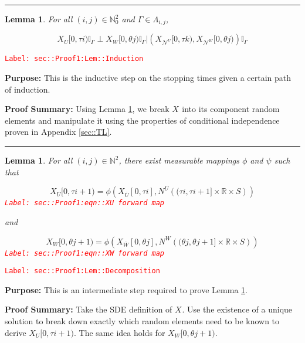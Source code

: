 \documentclass[12pt]{article}
\newcommand{\mb}{\mathbb}
\newcommand{\mc}{\mathcal}
\newcommand{\ov}{\overline}
\newcommand{\tr}{\textcolor{red}}
\newcommand{\labe}[1]{\tr{\texttt{Label: #1}}}
\newcommand{\purpose}{\textbf{Purpose: }}
\newcommand{\pfsum}{\textbf{Proof Summary: }}
\newcommand{\lin}{\rule{\linewidth}{0.4 pt}}
\renewcommand{\U}{U}							%
\newcommand{\UU}{W}								%
\renewcommand{\S}{S}							%
\newcommand{\X}{X}								%
\newcommand{\neigh}{\mc{N}}						%
\newcommand{\vind}[1]{^{#1}}					%
\newcommand{\cind}[1]{_{#1}}					%
\newcommand{\cl}{\ov}							%
\newcommand{\tip}[1]{#1}						%
\newcommand{\poiss}{N}							%
\newcommand{\rt}{\tau}							%
\newcommand{\rtt}{\theta}						%
\renewcommand{\it}{k}							%
\newcommand{\apath}{\Gamma}						%
\newcommand{\pathset}[2]{\Lambda_{#1,#2}}		%
\newtheorem{lem}[thms]{Lemma}
\begin{document}
\lin

\begin{lem}
For all \((i,j)\in \mb{N}_0^2\) and \(\apath{} \in \pathset{i}{j}\),

\[\X\cind{\U}\tip{[0,\rt{i})}\mb{I}_{\apath{}}\perp \X\cind{\UU}\tip{[0,\rtt{j})}\mb{I}_{\apath{}}|\left(\X\cind{\neigh\vind{\U}}\tip{[0,\rt{\it})},\X\cind{\neigh\vind{\UU}}\tip{[0,\rtt{j})}\right)\mb{I}_{\apath{}}\]
\label{sec::Proof1:Lem::Induction}
\end{lem}
\labe{sec::Proof1:Lem::Induction}

\purpose This is the inductive step on the stopping times given a certain path of induction.

\pfsum Using Lemma \ref{sec::Proof1:Lem::Decomposition}, we break \(\X\cind{}\tip{}\) into its component random elements and manipulate it using the properties of conditional independence proven in Appendix \ref{sec::TL}.

\lin

\begin{lem}
For all \((i,j)\in \mb{N}^2\), there exist measurable mappings \(\phi\) and \(\psi\) such that 

\begin{equation}
\X\cind{\U}\tip{[0,\rt{i+1})} = \phi\left(\X\cind{\cl{\U}}\tip{[0,\rt{i}]}, \poiss\vind{\U}\left((\rt{i}, \rt{i+1}]\times \mb{R}\times \S\right)\right)
\label{sec::Proof1:eqn::XU forward map}
\end{equation}
\labe{sec::Proof1:eqn::XU forward map}

and

\begin{equation}
\X\cind{\UU}\tip{[0,\rtt{j+1})} = \phi\left(\X\cind{\cl{\UU}}\tip{[0,\rtt{j}]}, \poiss\vind{\UU}\left((\rtt{j}, \rtt{j+1}]\times \mb{R}\times \S\right)\right)
\label{sec::Proof1:eqn::XW forward map}
\end{equation}
\labe{sec::Proof1:eqn::XW forward map}

\label{sec::Proof1:Lem::Decomposition}
\end{lem}
\labe{sec::Proof1:Lem::Decomposition}

\purpose This is an intermediate step required to prove Lemma \ref{sec::Proof1:Lem::Induction}.

\pfsum Take the SDE definition of \(\X\cind{}\tip{}\). Use the existence of a unique solution to break down exactly which random elements need to be known to derive \(\X\cind{\U}\tip{[0,\rt{i+1})}\). The same idea holds for \(\X\cind{\UU}\tip{[0,\rtt{j+1})}\).
\end{document}
